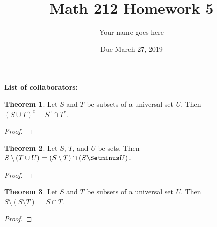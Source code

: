 \documentclass[11pt]{article}		%
\title{Math 212 Homework 5}
\author{Your name goes here}
\date{Due March 27, 2019}
\theoremstyle{definition}
\newtheorem{theorem}{Theorem}
\begin{document}
\maketitle

\noindent\textbf{List of collaborators:}


\begin{theorem}
	Let $S$ and $T$ be subsets of a universal set $U$.
	Then $(S\cup T)^c = S^c \cap T^c$.
\end{theorem}

\begin{proof}

\end{proof}


\begin{theorem}
	Let $S$, $T$, and $U$ be sets.
	Then $S\setminus (T\cup U) = (S\setminus T) \cap (S\Setminus U)$.
\end{theorem}

\begin{proof} %

\end{proof}


\begin{theorem}
	Let $S$ and $T$ be subsets of a universal set $U$.
	Then $S\setminus (S\setminus T) = S\cap T$.
\end{theorem}

\begin{proof}

\end{proof}
\end{document}
